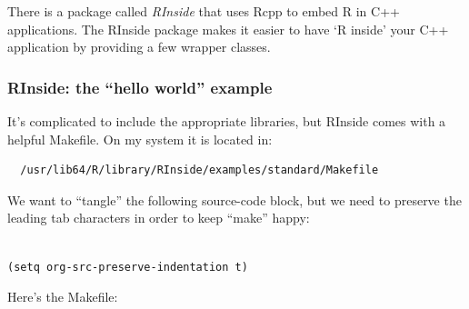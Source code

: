 \documentclass[11pt]{article}
\begin{document}
There is a package called \emph{RInside} that uses Rcpp to embed R in C++
applications.  The RInside package makes it easier to have `R inside'
your C++ application by providing a few wrapper classes.
\subsubsection{RInside: the ``hello world'' example}
\label{sec-3-2-1}


It's complicated to include the appropriate libraries, but RInside
comes with a helpful Makefile.  On my system it is located in:


\begin{verbatim}
  /usr/lib64/R/library/RInside/examples/standard/Makefile
\end{verbatim}

We want to ``tangle'' the following source-code block, but we need to
preserve the leading tab characters in order to keep ``make'' happy:


\begin{verbatim}

(setq org-src-preserve-indentation t)
\end{verbatim}

Here's the Makefile:
\end{document}
